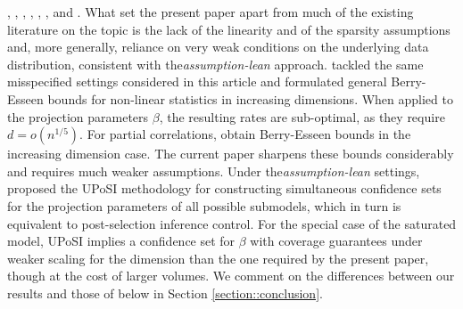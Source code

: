 \documentclass{article}
\begin{document}
\cite{javanmard2014confidence}, \cite{javanmard2018}, \cite{ning2017},
\cite{zhu2018,doi:10.1080/01621459.2017.1356319}, \cite{cai2017confidence}, \cite{ren2015}, \cite{rajen.peter.2018} and \cite{peter.sarah.2015}.
What set the present paper apart from much of the existing
literature on the topic is the lack of the linearity and of the sparsity assumptions and, more generally, reliance on very weak conditions on the underlying data distribution, consistent with the{\it assumption-lean} approach.
\cite{boot} tackled the same misspecified settings considered in this article and formulated general Berry-Esseen bounds for non-linear statistics
in increasing dimensions.
When applied to the projection parameters $\beta$,
the resulting rates are sub-optimal, as they require
$d = o(n^{1/5})$.
For partial correlations,
\cite{wasserman2014berry}
obtain Berry-Esseen bounds in the increasing dimension case.
The current paper sharpens these bounds considerably and requires much weaker assumptions.
Under the{\it assumption-lean} settings, \cite{kuchibhotla2018valid} proposed the UPoSI methodology for constructing simultaneous confidence sets for the projection parameters of all possible submodels, which in turn is equivalent to post-selection inference control. For the special case of the saturated model, UPoSI implies a confidence set for $\beta$ with coverage guarantees under weaker scaling for the dimension than the one required by the present paper, though at the cost of larger volumes. We comment on the differences between our results and those of
\cite{kuchibhotla2018valid} below in Section \ref{section::conclusion}.
\end{document}
